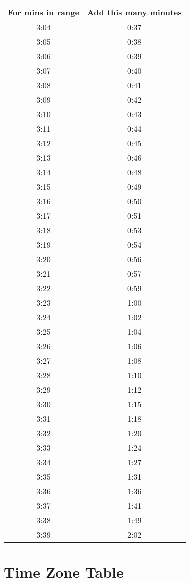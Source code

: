 		\begin{minipage}{0.5\textwidth}\begin{tabular}[t]{c|c}
					For mins in range & Add this many minutes \\\hline
	3:04 & 0:37 \\\hline
					3:05 & 0:38 \\\hline
						3:06 & 0:39 \\\hline
					3:07 & 0:40 \\\hline
					3:08 & 0:41 \\\hline
					3:09 & 0:42 \\\hline
	3:10 & 0:43 \\\hline
	3:11 & 0:44 \\\hline
	3:12 & 0:45 \\\hline
	3:13 & 0:46 \\\hline
	3:14 & 0:48 \\\hline
	3:15 & 0:49 \\\hline
	3:16 & 0:50 \\\hline
	3:17 & 0:51 \\\hline
	3:18 & 0:53 \\\hline
	3:19 & 0:54 \\\hline
	3:20 & 0:56 \\\hline
	3:21 & 0:57 \\\hline
	3:22 & 0:59 \\\hline
	3:23 & 1:00 \\\hline
	3:24 & 1:02 \\\hline
	3:25 & 1:04 \\\hline
	3:26 & 1:06 \\\hline
	3:27 & 1:08 \\\hline
	3:28 & 1:10 \\\hline
	3:29 & 1:12 \\\hline
	3:30 & 1:15 \\\hline
	3:31 & 1:18 \\\hline
	3:32 & 1:20 \\\hline
	3:33 & 1:24 \\\hline
	3:34 & 1:27 \\\hline
	3:35 & 1:31 \\\hline
	3:36 & 1:36 \\\hline
	3:37 & 1:41 \\\hline
	3:38 & 1:49 \\\hline
	3:39 & 2:02
\end{tabular}\end{minipage}\newpage

\section{Time Zone Table}

